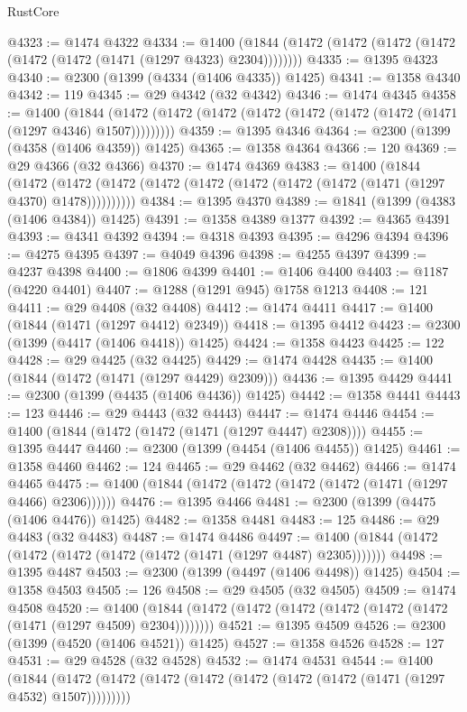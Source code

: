 \begin{lexlean}{RustCore}
\begin{coremodule}
@4323 := @1474 @4322
@4334 := @1400 (@1844 (@1472 (@1472 (@1472 (@1472 (@1472 (@1472 (@1471 (@1297 @4323) @2304))))))))
@4335 := @1395 @4323
@4340 := @2300 (@1399 (@4334 (@1406 @4335)) @1425)
@4341 := @1358 @4340
@4342 := 119
@4345 := @29 @4342 (@32 @4342)
@4346 := @1474 @4345
@4358 := @1400
    (@1844 (@1472 (@1472 (@1472 (@1472 (@1472 (@1472 (@1472 (@1471 (@1297 @4346) @1507)))))))))
@4359 := @1395 @4346
@4364 := @2300 (@1399 (@4358 (@1406 @4359)) @1425)
@4365 := @1358 @4364
@4366 := 120
@4369 := @29 @4366 (@32 @4366)
@4370 := @1474 @4369
@4383 := @1400
    (@1844
      (@1472 (@1472 (@1472 (@1472 (@1472 (@1472 (@1472 (@1472 (@1471 (@1297 @4370) @1478))))))))))
@4384 := @1395 @4370
@4389 := @1841 (@1399 (@4383 (@1406 @4384)) @1425)
@4391 := @1358 @4389 @1377
@4392 := @4365 @4391
@4393 := @4341 @4392
@4394 := @4318 @4393
@4395 := @4296 @4394
@4396 := @4275 @4395
@4397 := @4049 @4396
@4398 := @4255 @4397
@4399 := @4237 @4398
@4400 := @1806 @4399
@4401 := @1406 @4400
@4403 := @1187 (@4220 @4401)
@4407 := @1288 (@1291 @945) @1758 @1213
@4408 := 121
@4411 := @29 @4408 (@32 @4408)
@4412 := @1474 @4411
@4417 := @1400 (@1844 (@1471 (@1297 @4412) @2349))
@4418 := @1395 @4412
@4423 := @2300 (@1399 (@4417 (@1406 @4418)) @1425)
@4424 := @1358 @4423
@4425 := 122
@4428 := @29 @4425 (@32 @4425)
@4429 := @1474 @4428
@4435 := @1400 (@1844 (@1472 (@1471 (@1297 @4429) @2309)))
@4436 := @1395 @4429
@4441 := @2300 (@1399 (@4435 (@1406 @4436)) @1425)
@4442 := @1358 @4441
@4443 := 123
@4446 := @29 @4443 (@32 @4443)
@4447 := @1474 @4446
@4454 := @1400 (@1844 (@1472 (@1472 (@1471 (@1297 @4447) @2308))))
@4455 := @1395 @4447
@4460 := @2300 (@1399 (@4454 (@1406 @4455)) @1425)
@4461 := @1358 @4460
@4462 := 124
@4465 := @29 @4462 (@32 @4462)
@4466 := @1474 @4465
@4475 := @1400 (@1844 (@1472 (@1472 (@1472 (@1472 (@1471 (@1297 @4466) @2306))))))
@4476 := @1395 @4466
@4481 := @2300 (@1399 (@4475 (@1406 @4476)) @1425)
@4482 := @1358 @4481
@4483 := 125
@4486 := @29 @4483 (@32 @4483)
@4487 := @1474 @4486
@4497 := @1400 (@1844 (@1472 (@1472 (@1472 (@1472 (@1472 (@1471 (@1297 @4487) @2305)))))))
@4498 := @1395 @4487
@4503 := @2300 (@1399 (@4497 (@1406 @4498)) @1425)
@4504 := @1358 @4503
@4505 := 126
@4508 := @29 @4505 (@32 @4505)
@4509 := @1474 @4508
@4520 := @1400 (@1844 (@1472 (@1472 (@1472 (@1472 (@1472 (@1472 (@1471 (@1297 @4509) @2304))))))))
@4521 := @1395 @4509
@4526 := @2300 (@1399 (@4520 (@1406 @4521)) @1425)
@4527 := @1358 @4526
@4528 := 127
@4531 := @29 @4528 (@32 @4528)
@4532 := @1474 @4531
@4544 := @1400
    (@1844 (@1472 (@1472 (@1472 (@1472 (@1472 (@1472 (@1472 (@1471 (@1297 @4532) @1507)))))))))

\end{coremodule}
\end{lexlean}
